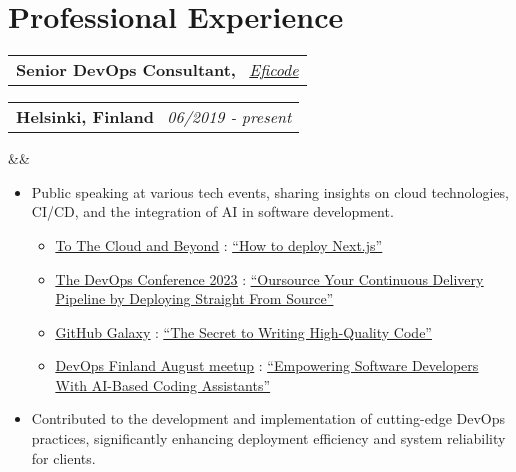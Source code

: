 \documentclass[11pt,a4paper,sans]{moderncv}
\makeatletter
\newcommand*{\customcventry}[7][.13em]{
\begin{tabular}{@{}l}
{\bfseries #4} \
{\itshape #3}
\end{tabular}
\hfill
\begin{tabular}{l@{}}
{\bfseries #5} \
{\itshape #2}
\end{tabular}
\ifx&#7&%
\else{\
\begin{minipage}{\maincolumnwidth}%
\small#7%
\end{minipage}}\fi%
\par\addvspace{#1}}
\newcommand{\inlineLink}[2]{%
    \underline{\href{#1}{#2}}%
}
\makeatother
\begin{document}
\section{Professional Experience}{
 \customcventry{06/2019 ‐ present}
 {{\color{blue}\href{https://eficode.com}{Eficode}}}
 {Senior DevOps Consultant,}
 {Helsinki, Finland}
 {}{}
 {
 	\begin{itemize}[leftmargin=0.6cm, label={\textbullet}]
 		\item Public speaking at various tech events, sharing insights on cloud technologies, CI/CD, and the integration of AI in software development.
 		      \begin{itemize}
 		      	\item
 		      	      \inlineLink{https://www.eficode.com/events/to-the-cloud-and-beyond}{To The Cloud and Beyond}:  \inlineLink{https://www.youtube.com/watch?v=vokeBcAZYaQ}{``How to deploy Next.js''}
 		      	       		      	      		      	                          
 		      	\item 
 		      	      \inlineLink{https://www.thedevopsconference.com/videos?name=adriaan+knapen&topic=all&event=5}{The DevOps Conference 2023}: 
 		      	      \inlineLink{https://www.youtube.com/watch?v=mdWIfox5O_E}{``Oursource Your Continuous Delivery Pipeline by Deploying Straight From Source''}
 		      	       		      	      		      	                          
 		      	\item
 		      	      \inlineLink{https://galaxy.github.com/session/day-1-the-secret-to-writing-high-quality-code-more-efficiently}{GitHub Galaxy}: \inlineLink{https://galaxy.github.com/session/day-1-the-secret-to-writing-high-quality-code-more-efficiently}{``The Secret to Writing High-Quality Code''}
 		      	       		      	      		      	              
 		      	\item
 		      	      \inlineLink{https://www.meetup.com/devops-finland/events/293742321/}{DevOps Finland August meetup}: 
 		      	      \inlineLink{https://gh.aknapen.nl/20230823--ai-assisted-development--devops-finland-meetup}{``Empowering Software Developers With AI-Based Coding Assistants''}    
 		      \end{itemize}
 		       		      		                      
 		\item Contributed to the development and implementation of cutting-edge DevOps practices, significantly enhancing deployment efficiency and system reliability for clients.
 		       		      		      

\end{itemize}}}
\end{document}
